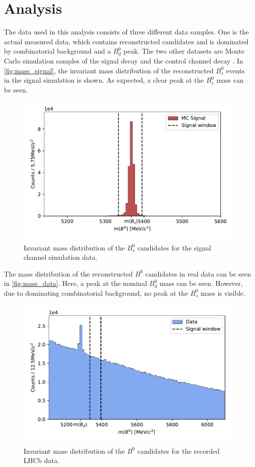 \section{Analysis}
\label{sec:Analysis}

The data used in this analysis consists of three different data samples. One is the actual measured data, which contains reconstructed \printBtoPsiKs \: candidates
and is dominated by combinatorial background and a $B^0_d$ peak. The two other datasets are Monte Carlo simulation samples of the signal decay \printBstoPsiKs \: 
and the control channel decay \printBdtoPsiKs.
In \autoref{fig:mass_signal}, the invariant mass distribution of the reconstructed $B^0_s$ events in the signal simulation is shown.
As expected, a clear peak at the $B^0_s$ mass can be seen.
\begin{figure}
  \centering
  \includegraphics[width = .8\textwidth]{"content/plots/mass_signal.pdf"}
  \caption{Invariant mass distribution of the $B^0_s$ candidates for the signal channel simulation data.}
  \label{fig:mass_signal}
\end{figure}
The mass distribution of the reconstructed $B^0$ candidates in real data can be seen in \autoref{fig:mass_data}. Here, a peak at the nominal $B^0_d$ mass can be seen. However,
due to dominating combinatorial background, no peak at the $B^0_s$ mass is visible.
\begin{figure}
  \centering
  \includegraphics[width = .8\textwidth]{"content/plots/mass_data.pdf"}
  \caption{Invariant mass distribution of the $B^0$ candidates for the recorded LHCb data.}
  \label{fig:mass_data}
\end{figure}
